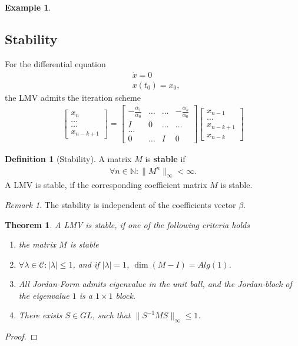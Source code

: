 \documentclass[a4paper,12pt,oneside,fleqn]{book}
\newtheorem{theorem}{Theorem}[section]
\theoremstyle{definition}
\newtheorem{definition}{Definition}[section]
\newtheorem*{example}{Example}
\theoremstyle{remark}
\newtheorem*{remark}{Remark}
\begin{document}
\begin{example}
	
\end{example}



\subsection{Stability}
For the differential equation
\begin{align*}
	& \dot{x} = 0\\
	& x(t_0) = x_0,
\end{align*}
the LMV admits the iteration scheme
\begin{align*}
	\begin{bmatrix}
		x_n\\
		\dots\\
		\dots\\
		x_{n - k + 1}
	\end{bmatrix}
	= 
	\begin{bmatrix}
		-\frac{\alpha_1}{\alpha_0} & \dots & \dots & -\frac{\alpha_k}{\alpha_0}\\
		I & 0 & \dots & \dots \\
		\dots\\
		0 & \dots & I & 0
	\end{bmatrix}
	\begin{bmatrix}
		x_{n - 1}\\
		\dots\\
		x_{n - k + 1}\\
		x_{n - k}
	\end{bmatrix}
\end{align*}
\begin{definition}[Stability]
A matrix $M$ is \textbf{stable} if 
\begin{align*}
	\forall n \in  \mathbb{N}: \|M^n\|_\infty <\infty.
\end{align*}
A LMV is stable, if the corresponding coefficient matrix $M$ is stable. 
\end{definition}
\begin{remark}
The stability is independent of the coefficients vector $\beta$. 	
\end{remark}


\begin{theorem}
	A LMV is stable, if one of the following criteria holds
	\begin{enumerate}
		\item the matrix $M$ is stable
		\item $\forall \lambda \in \mathcal{C}: |\lambda| \le 1$, and if $|\lambda| = 1$, $\dim (M - I) = Alg(1)$. 
		\item All Jordan-Form admits eigenvalue in the unit ball, and the Jordan-block of the eigenvalue $1$ is a $1 \times 1$ block. 
		\item There exists $S \in GL$, such that $\|S^{-1}M S\|_\infty \le 1$. 
	\end{enumerate}
\end{theorem}
\begin{proof}
	
\end{proof}
\end{document}
